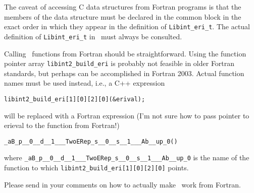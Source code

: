 \documentclass[12pt]{article}
\begin{document}
The caveat of accessing C data structures from Fortran programs is that the members of the data structure must be
declared in the common block in the exact order in which they appear in the definition of {\tt Libint\_eri\_t}.
The actual definition of {\tt Libint\_eri\_t} in \libinttypesh\ must always be consulted.

Calling \LIBINT\ functions from Fortran should be straightforward. Using the function pointer array {\tt libint2\_build\_eri} is probably
not feasible in older Fortran standards, but perhaps can be accomplished in Fortran 2003. Actual function names must be used instead, i.e.,
a C++ expression
\begin{verbatim}
libint2_build_eri[1][0][2][0](&erival);
\end{verbatim}
will be replaced with a Fortran expression (I'm not sure how to pass pointer to erieval to the function from Fortran!)
\begin{verbatim}
_aB_p__0__d__1___TwoERep_s__0__s__1___Ab__up_0()
\end{verbatim}
where {\tt \_aB\_p\_\_0\_\_d\_\_1\_\_\_TwoERep\_s\_\_0\_\_s\_\_1\_\_\_Ab\_\_up\_0} is the name of the function
to which {\tt libint2\_build\_eri[1][0][2][0]} points.

Please send in your comments on how to actually make \LIBINT\ work from Fortran.



\end{document}
